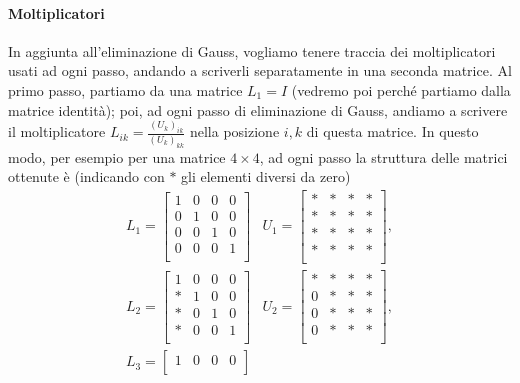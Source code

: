 \documentclass[a4paper]{report}
\theoremstyle{definiton}
\theoremstyle{remark}
\begin{document}
\paragraph{Moltiplicatori}
In aggiunta all'eliminazione di Gauss, vogliamo tenere traccia dei moltiplicatori usati ad ogni passo, andando a scriverli separatamente in una seconda matrice. Al primo passo, partiamo da una matrice $L_1 = I$ (vedremo poi perché partiamo dalla matrice identità); poi, ad ogni passo di eliminazione di Gauss, andiamo a scrivere il moltiplicatore $L_{ik} = \frac{(U_k)_{ik}}{(U_k)_{kk}}$ nella posizione $i,k$ di questa matrice. In questo modo, per esempio per una matrice $4\times 4$,  ad ogni passo la struttura delle matrici ottenute è (indicando con $*$ gli elementi diversi da zero)
\[
    \begin{array}{ll}
    L_1 = \begin{bmatrix}
        1 & 0 & 0 & 0\\
        0 & 1 & 0 & 0\\
        0 & 0 & 1 & 0\\        
        0 & 0 & 0 & 1\\
    \end{bmatrix} 
    & U_1 = \begin{bmatrix}
        * & * & * & *\\
        * & * & * & *\\
        * & * & * & *\\
        * & * & * & *\\
    \end{bmatrix},\\[6ex]
    L_2 = \begin{bmatrix}
        1 & 0 & 0 & 0\\
        * & 1 & 0 & 0\\
        * & 0 & 1 & 0\\        
        * & 0 & 0 & 1\\
    \end{bmatrix} & U_2 = \begin{bmatrix}
        * & * & * & *\\
        0 & * & * & *\\
        0 & * & * & *\\
        0 & * & * & *\\
    \end{bmatrix},\\[6ex]
    L_3 = \begin{bmatrix}
        1 & 0 & 0 & 0\\

\end{bmatrix}
\end{array}\]
\end{document}
